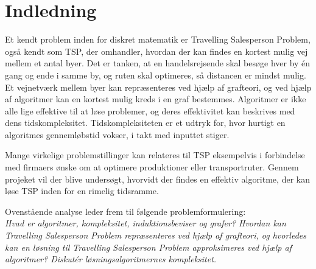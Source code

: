 \chapter{Indledning}
Et kendt problem inden for diskret matematik er Travelling Salesperson Problem, også kendt som TSP, der omhandler, hvordan der kan findes en kortest mulig vej mellem et antal byer. 
Det er tanken, at en handelsrejsende skal besøge hver by én gang og ende i samme by, og ruten skal optimeres, så distancen er mindst mulig. 
Et vejnetværk mellem byer kan repræsenteres ved hjælp af grafteori, og ved hjælp af algoritmer kan en kortest mulig kreds i en graf bestemmes. 
Algoritmer er ikke alle lige effektive til at løse problemer, og deres effektivitet kan beskrives med dens tidskompleksitet. 
Tidskompleksiteten er et udtryk for, hvor hurtigt en algoritmes gennemløbstid vokser, i takt med inputtet stiger. 

Mange virkelige problemstillinger kan relateres til TSP eksempelvis i forbindelse med firmaers ønske om at optimere produktioner eller transportruter. 
Gennem projeket vil der blive undersøgt, hvorvidt der findes en effektiv algoritme, der kan løse TSP inden for en rimelig tidsramme.

Ovenstående analyse leder frem til følgende problemformulering:\\

\textit{Hvad er algoritmer, kompleksitet, induktionsbeviser og grafer? Hvordan kan Travelling Salesperson Problem repræsenteres ved hjælp af grafteori, og hvorledes kan en løsning til Travelling Salesperson Problem approksimeres ved hjælp af algoritmer? Diskutér løsningsalgoritmernes kompleksitet.}
